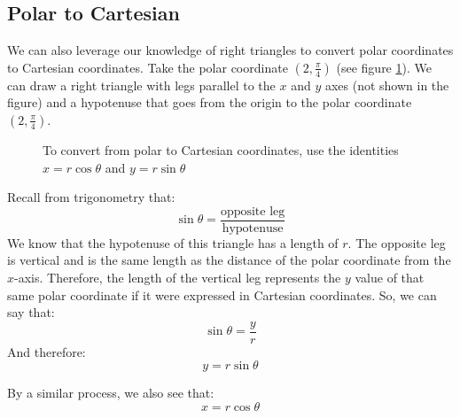 \subsection{Polar to Cartesian}
We can also leverage our knowledge of right triangles to convert polar 
coordinates to Cartesian coordinates. Take the polar coordinate $(2, 
\frac{\pi}{4})$ (see figure \ref{fig:polar_to_cart}). We can draw a right 
triangle with legs parallel to the $x$ and $y$ axes (not shown in the figure) 
and a hypotenuse that goes from the origin to the polar coordinate $(2, \frac{
\pi}{4})$. 

\begin{figure}[H]
\centering
    \caption{To convert from polar to Cartesian coordinates, use the identities 
    $x = r\cos{\theta}$ and $y = r\sin{\theta}$}
    \label{fig:polar_to_cart}
    \end{figure}

Recall from trigonometry that:
$$\sin{\theta} = \frac{\text{opposite leg}}{\text{hypotenuse}}$$
We know that the hypotenuse of this triangle has a length of $r$. The opposite 
leg is vertical and is the same length as the distance of the polar coordinate 
from the $x$-axis. Therefore, the length of the vertical leg represents the 
$y$ value of that same polar coordinate if it were expressed in Cartesian 
coordinates. So, we can say that:
$$\sin{\theta} = \frac{y}{r}$$
And therefore:
$$y = r\sin{\theta}$$

By a similar process, we also see that:
$$x = r\cos{\theta}$$

